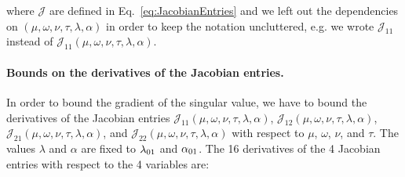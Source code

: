 \documentclass{article}
\begin{document}
where $\mathcal J$ are defined in Eq.~\eqref{eq:JacobianEntries} and we left out the dependencies on 
$(\mu,\omega,\nu,\tau,\lambda ,\alpha)$ in order to keep the notation uncluttered, e.g. we 
wrote ${\mathcal J}_{11}$ instead of ${\mathcal J}_{11} (\mu,\omega,\nu,\tau,\lambda ,\alpha)$.









\paragraph{Bounds on the derivatives of the Jacobian entries.}

In order to bound the gradient of the singular value, we have to bound
the derivatives of the Jacobian entries 
${\mathcal J}_{11}(\mu,\omega,\nu,\tau,\lambda ,\alpha )$,
${\mathcal J}_{12}(\mu,\omega,\nu,\tau,\lambda ,\alpha )$,
${\mathcal J}_{21}(\mu,\omega,\nu,\tau,\lambda ,\alpha )$, and
${\mathcal J}_{22}(\mu,\omega,\nu,\tau,\lambda ,\alpha )$
with respect to 
$\mu$, $\omega$, $\nu$, and $\tau$. The values 
$\lambda$ and $\alpha$ are fixed to $\lambda_{\rm 01}$ and $\alpha_{\rm 01}$.
The 16 derivatives of the 4 Jacobian entries with respect to the 4
variables are:
\end{document}
